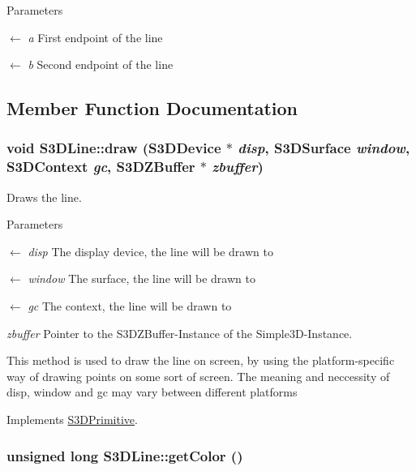 \begin{DoxyParams}{Parameters}
\item[\mbox{$\leftarrow$} {\em a}]First endpoint of the line \item[\mbox{$\leftarrow$} {\em b}]Second endpoint of the line \end{DoxyParams}


\subsection{Member Function Documentation}
\hypertarget{class_s3_d_line_aa7732c2d83fecb5d9934863d0e7875c1}{
\subsubsection[{draw}]{\setlength{\rightskip}{0pt plus 5cm}void S3DLine::draw ({\bf S3DDevice} $\ast$ {\em disp}, \/  {\bf S3DSurface} {\em window}, \/  {\bf S3DContext} {\em gc}, \/  {\bf S3DZBuffer} $\ast$ {\em zbuffer})}}
\label{class_s3_d_line_aa7732c2d83fecb5d9934863d0e7875c1}


Draws the line. 


\begin{DoxyParams}{Parameters}
\item[\mbox{$\leftarrow$} {\em disp}]The display device, the line will be drawn to \item[\mbox{$\leftarrow$} {\em window}]The surface, the line will be drawn to \item[\mbox{$\leftarrow$} {\em gc}]The context, the line will be drawn to \item[{\em zbuffer}]Pointer to the S3DZBuffer-\/Instance of the Simple3D-\/Instance.\end{DoxyParams}
This method is used to draw the line on screen, by using the platform-\/specific way of drawing points on some sort of screen. The meaning and neccessity of disp, window and gc may vary between different platforms 

Implements \hyperlink{class_s3_d_primitive_a857f042bc63ae6233b63b60089e92b81}{S3DPrimitive}.

\hypertarget{class_s3_d_line_a62b49873ae3356cf997ca1fd87a1b7de}{
\subsubsection[{getColor}]{\setlength{\rightskip}{0pt plus 5cm}unsigned long S3DLine::getColor ()}}
\label{class_s3_d_line_a62b49873ae3356cf997ca1fd87a1b7de}


